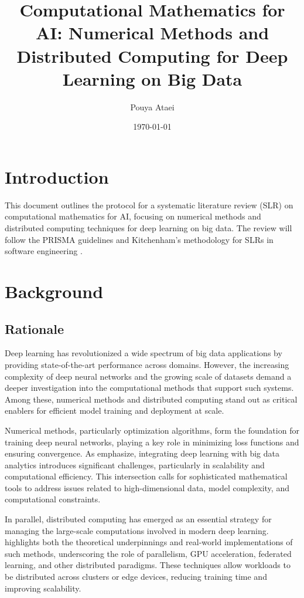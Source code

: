\documentclass[12pt]{acm/acmart}
\title{Computational Mathematics for AI: Numerical Methods and Distributed Computing for Deep Learning on Big Data}
\author{Pouya Ataei}
\date{\today}
\begin{document}
\maketitle

\section{Introduction}\label{sec:introduction}
This document outlines the protocol for a systematic literature review (SLR) on computational mathematics for AI, focusing on numerical methods and distributed computing techniques for deep learning on big data. The review will follow the PRISMA guidelines \citep{moher2009preferred} and Kitchenham's methodology for SLRs in software engineering \citep{kitchenham2007guidelines}.


\section{Background}\label{sec:background}
\subsection{Rationale}\label{subsec:rationale}
Deep learning has revolutionized a wide spectrum of big data applications by providing state-of-the-art performance across domains.
However, the increasing complexity of deep neural networks and the growing scale of datasets demand a deeper investigation into
the computational methods that support such systems. Among these, numerical methods and distributed computing stand out as critical
enablers for efficient model training and deployment at scale.

Numerical methods, particularly optimization algorithms, form the foundation for training deep neural networks, playing a key role
in minimizing loss functions and ensuring convergence. As \citet{najafabadi2015deep} emphasize, integrating deep learning with
big data analytics introduces significant challenges, particularly in scalability and computational efficiency.
This intersection calls for sophisticated mathematical tools to address issues related to high-dimensional data, model complexity,
and computational constraints.

In parallel, distributed computing has emerged as an essential strategy for managing the large-scale computations involved in
modern deep learning. \citet{yan2023computational} highlights both the theoretical underpinnings and real-world implementations of such methods,
underscoring the role of parallelism, GPU acceleration, federated learning, and other distributed paradigms.
These techniques allow workloads to be distributed across clusters or edge devices, reducing training time and improving scalability.
\end{document}
